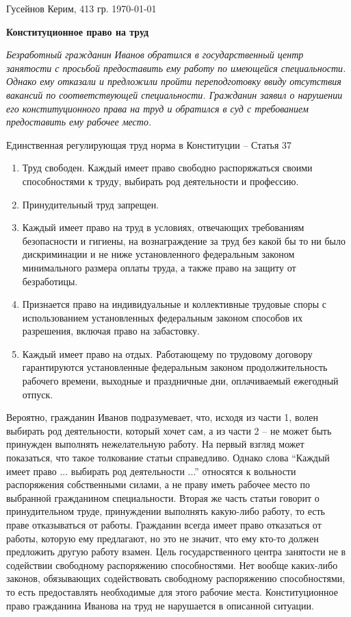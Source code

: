 \documentclass[a4paper, 12pt]{article}
\begin{document}
\noindent
Гусейнов Керим, 413 гр.
\hfill 
\today


\begin{center}\bf
Конституционное право на труд
\end{center}

\textit{Безработный гражданин Иванов обратился в государственный центр занятости с просьбой предоставить ему работу по имеющейся специальности. Однако ему отказали и предложили пройти переподготовку ввиду отсутствия вакансий по соответствующей специальности. Гражданин заявил о нарушении его конституционного права на труд и обратился в суд с требованием предоставить ему рабочее место.}

Единственная регулирующая труд норма в Конституции -- Статья 37 
\begin{enumerate}
\item Труд свободен. Каждый имеет право свободно распоряжаться своими способностями к труду, выбирать род деятельности и профессию. 
\item Принудительный труд запрещен. 
\item Каждый имеет право на труд в условиях, отвечающих требованиям безопасности и гигиены, на вознаграждение за труд без какой бы то ни было дискриминации и не ниже установленного федеральным законом минимального размера оплаты труда, а также право на защиту от безработицы. 
\item Признается право на индивидуальные и коллективные трудовые споры с использованием установленных федеральным законом способов их разрешения, включая право на забастовку. 
\item Каждый имеет право на отдых. Работающему по трудовому договору гарантируются установленные федеральным законом продолжительность рабочего времени, выходные и праздничные дни, оплачиваемый ежегодный отпуск.
\end{enumerate}

Вероятно, гражданин Иванов подразумевает, что, исходя из части 1, волен выбирать род деятельности, который хочет сам, а из части 2 -- не может быть принужден выполнять нежелательную работу. 
На первый взгляд может показаться, что такое толкование статьи справедливо. 
Однако слова ``Каждый имеет право ... выбирать род деятельности ...'' относятся к вольности распоряжения собственными силами, а не праву иметь рабочее место по выбранной гражданином специальности. 
Вторая же часть статьи говорит о принудительном труде, принуждении выполнять какую-либо работу, то есть праве отказываться от работы. 
Гражданин всегда имеет право отказаться от работы, которую ему предлагают, но это не значит, что ему кто-то должен предложить другую работу взамен. 
Цель государственного центра занятости не в содействии свободному распоряжению способностями. 
Нет вообще каких-либо законов, обязывающих содействовать свободному распоряжению способностями, то есть предоставлять необходимые для этого рабочие места. 
Конституционное право гражданина Иванова на труд не нарушается в описанной ситуации. 
\end{document}
